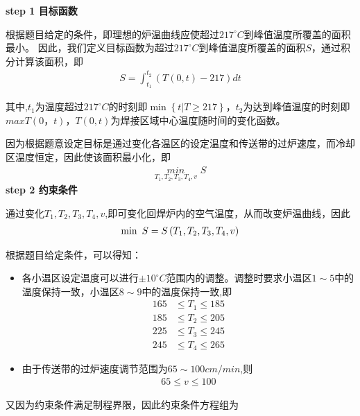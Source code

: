 \documentclass[../main.tex]{subfiles}
\begin{document}
  \noindent \textbf{step 1 目标函数}
  \par 根据题目给定的条件，即理想的炉温曲线应使超过\(217^{\circ}C\)到峰值温度所覆盖的面积最小。 因此，我们定义目标函数为超过$217^{\circ}C$到峰值温度所覆盖的面积$S$，通过积分计算该面积，即
  \begin{align}\label{8.1}
    S=\int_{t_1}^{t_2}(T(0,t)-217)dt 
  \end{align}
 \par 其中,$t_1$为温度超过$217^{\circ}C$的时刻即$\min \left\{ t|T\ge 217 \right\} $，$t_2$为达到峰值温度的时刻即$max T(0，t)$，$T(0,t)$为焊接区域中心温度随时间的变化函数。
 \par 因为根据题意设定目标是通过变化各温区的设定温度和传送带的过炉速度，而冷却区温度恒定，因此使该面积最小化，即
 \begin{align}\label{8.2}
  \underset{T_1,T_2,T_3,T_4,v}{min}\,\,S
 \end{align}
 \noindent \textbf{step 2 约束条件}
\par 通过变化$T_1,T_2,T_3,T_4,v$,即可变化回焊炉内的空气温度，从而改变炉温曲线，因此
\begin{align}
  \min\text{\,\,}S=S\left( T_1,T_2,T_3,T_4,v \right)  
\end{align}
\par  根据题目给定条件，可以得知：
  \begin{itemize}
    \item  各小温区设定温度可以进行$\pm10^{\circ}C$范围内的调整。调整时要求小温区$1\sim5$中的温度保持一致，小温区$8\sim9$中的温度保持一致,即
    \begin{align}
      165 &\leq T_1 \leq 185 \label{8.3} \\
      185 &\leq T_2 \leq 205  \label{8.4}\\
      225 &\leq T_3 \leq 245 \label{8.5}\\
      245 &\leq T_4 \leq 265 \label{8.6}
      \end{align}
    \item 由于传送带的过炉速度调节范围为$65 \sim 100 cm/min$,则
    \begin{align}\label{8.7}
      65\leq v\leq100
    \end{align}
  \end{itemize}
  \par 又因为约束条件满足制程界限，因此约束条件方程组为
\end{document}

